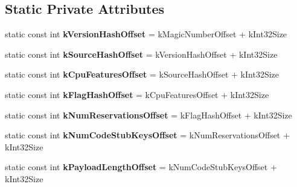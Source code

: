\subsection*{Static Private Attributes}
\begin{DoxyCompactItemize}
\item 
static const int {\bfseries k\+Version\+Hash\+Offset} = k\+Magic\+Number\+Offset + k\+Int32\+Size\hypertarget{classv8_1_1internal_1_1_serialized_code_data_a1140750b0862cf2db704c68eed85a6aa}{}\label{classv8_1_1internal_1_1_serialized_code_data_a1140750b0862cf2db704c68eed85a6aa}

\item 
static const int {\bfseries k\+Source\+Hash\+Offset} = k\+Version\+Hash\+Offset + k\+Int32\+Size\hypertarget{classv8_1_1internal_1_1_serialized_code_data_a0829c28efdf2d52de4e8e269a0692709}{}\label{classv8_1_1internal_1_1_serialized_code_data_a0829c28efdf2d52de4e8e269a0692709}

\item 
static const int {\bfseries k\+Cpu\+Features\+Offset} = k\+Source\+Hash\+Offset + k\+Int32\+Size\hypertarget{classv8_1_1internal_1_1_serialized_code_data_a9723c6db7e1df4a35fe5605bba90fb1c}{}\label{classv8_1_1internal_1_1_serialized_code_data_a9723c6db7e1df4a35fe5605bba90fb1c}

\item 
static const int {\bfseries k\+Flag\+Hash\+Offset} = k\+Cpu\+Features\+Offset + k\+Int32\+Size\hypertarget{classv8_1_1internal_1_1_serialized_code_data_aa223e0003be459d67f88284cf41161d0}{}\label{classv8_1_1internal_1_1_serialized_code_data_aa223e0003be459d67f88284cf41161d0}

\item 
static const int {\bfseries k\+Num\+Reservations\+Offset} = k\+Flag\+Hash\+Offset + k\+Int32\+Size\hypertarget{classv8_1_1internal_1_1_serialized_code_data_a16efdaa844abc5fea83b9de84fb0fc4d}{}\label{classv8_1_1internal_1_1_serialized_code_data_a16efdaa844abc5fea83b9de84fb0fc4d}

\item 
static const int {\bfseries k\+Num\+Code\+Stub\+Keys\+Offset} = k\+Num\+Reservations\+Offset + k\+Int32\+Size\hypertarget{classv8_1_1internal_1_1_serialized_code_data_ac70c03dacc482b6b18206a25539028ec}{}\label{classv8_1_1internal_1_1_serialized_code_data_ac70c03dacc482b6b18206a25539028ec}

\item 
static const int {\bfseries k\+Payload\+Length\+Offset} = k\+Num\+Code\+Stub\+Keys\+Offset + k\+Int32\+Size\hypertarget{classv8_1_1internal_1_1_serialized_code_data_a1c1b263da1d38a55f2eb0b83f4d9eb8d}{}\label{classv8_1_1internal_1_1_serialized_code_data_a1c1b263da1d38a55f2eb0b83f4d9eb8d}


\end{DoxyCompactItemize}
